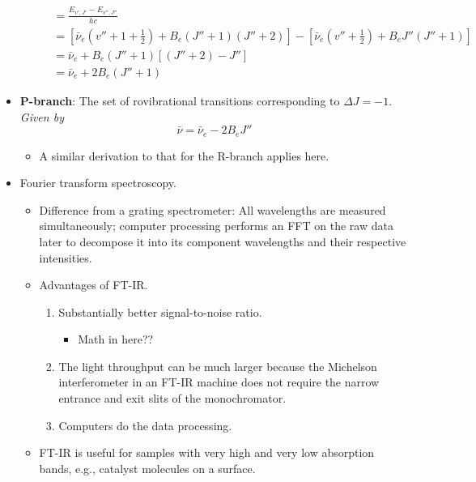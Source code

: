 \documentclass[../notes.tex]{subfiles}
\begin{document}
\begin{itemize}
\begin{itemize}
\begin{align*}
            &= \frac{E_{v',J'}-E_{v'',J''}}{hc}\\
            &= \left[ \bar{\nu}_e\left( v''+1+\frac{1}{2} \right)+B_e(J''+1)(J''+2) \right]-\left[ \bar{\nu}_e\left( v''+\frac{1}{2} \right)+B_eJ''(J''+1) \right]\\
            &= \bar{\nu}_e+B_e(J''+1)[(J''+2)-J'']\\
            &= \bar{\nu}_e+2B_e(J''+1)
        \end{align*}
    \end{itemize}
    \item \textbf{P-branch}: The set of rovibrational transitions corresponding to $\Delta J=-1$. \emph{Given by}
    \begin{equation*}
        \bar{\nu} = \bar{\nu}_e-2B_eJ''
    \end{equation*}
    \begin{itemize}
        \item A similar derivation to that for the R-branch applies here.
    \end{itemize}
    \item Fourier transform spectroscopy.
    \begin{itemize}
        \item Difference from a grating spectrometer: All wavelengths are measured simultaneously; computer processing performs an FFT on the raw data later to decompose it into its component wavelengths and their respective intensities.
        \item Advantages of FT-IR.
        \begin{enumerate}
            \item Substantially better signal-to-noise ratio.
            \begin{itemize}
                \item Math in here??
            \end{itemize}
            \item The light throughput can be much larger because the Michelson interferometer in an FT-IR machine does not require the narrow entrance and exit slits of the monochromator.
            \item Computers do the data processing.
        \end{enumerate}
        \item FT-IR is useful for samples with very high and very low absorption bands, e.g., catalyst molecules on a surface.
    \end{itemize}
\end{itemize}
\end{document}
